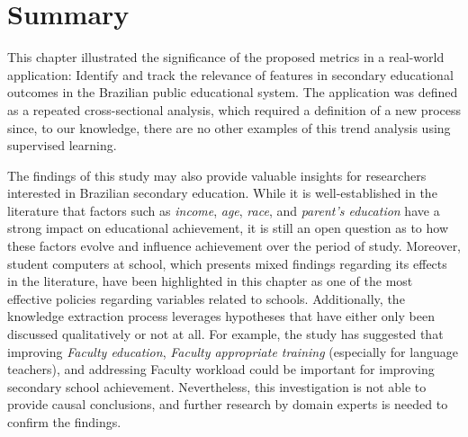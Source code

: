 \section{Summary}

This chapter illustrated the significance of the proposed metrics in a real-world application: Identify and track the relevance of features in secondary educational outcomes in the Brazilian public educational system. The application was defined as a repeated cross-sectional analysis, which required a definition of a new process since, to our knowledge,  there are no other examples of this trend analysis using supervised learning. 

The findings of this study may also provide valuable insights for researchers interested in Brazilian secondary education. While it is well-established in the literature that factors such as \textit{income}, \textit{age}, \textit{race}, and \textit{parent's education} have a strong impact on educational achievement, it is still an open question as to how these factors evolve and influence achievement over the period of study. Moreover, student computers at school, which presents mixed findings regarding its effects in the literature, have been highlighted in this chapter as one of the most effective policies regarding variables related to schools. Additionally, the knowledge extraction process leverages hypotheses that have either only been discussed qualitatively or not at all. For example, the study has suggested that improving \textit{Faculty education}, \textit{Faculty appropriate training} (especially for language teachers), and addressing Faculty workload could be important for improving secondary school achievement. Nevertheless, this investigation is not able to provide  causal conclusions, and further research by domain experts is needed to confirm the findings. 